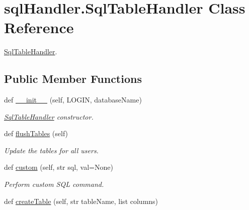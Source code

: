 \hypertarget{classsql_handler_1_1_sql_table_handler}{}\section{sql\+Handler.\+Sql\+Table\+Handler Class Reference}
\label{classsql_handler_1_1_sql_table_handler}


\mbox{\hyperlink{classsql_handler_1_1_sql_table_handler}{Sql\+Table\+Handler}}.  


\subsection*{Public Member Functions}
\begin{DoxyCompactItemize}
\item 
def \mbox{\hyperlink{classsql_handler_1_1_sql_table_handler_a3eba23f872710ef3a21c172a9469a449}{\+\_\+\+\_\+init\+\_\+\+\_\+}} (self, L\+O\+G\+IN, database\+Name)
\begin{DoxyCompactList}\small\item\em \mbox{\hyperlink{classsql_handler_1_1_sql_table_handler}{Sql\+Table\+Handler}} constructor. \end{DoxyCompactList}\item 
\mbox{\label{classsql_handler_1_1_sql_table_handler_a70fc8504c5f3b3a5d7fe482f6907cb74}} 
def \mbox{\hyperlink{classsql_handler_1_1_sql_table_handler_a70fc8504c5f3b3a5d7fe482f6907cb74}{flush\+Tables}} (self)
\begin{DoxyCompactList}\small\item\em Update the tables for all users. \end{DoxyCompactList}\item 
def \mbox{\hyperlink{classsql_handler_1_1_sql_table_handler_a153cbc56e8b7a0b595566d4e28c1d482}{custom}} (self, str sql, val=None)
\begin{DoxyCompactList}\small\item\em Perform custom S\+QL command. \end{DoxyCompactList}\item 
\mbox{\label{classsql_handler_1_1_sql_table_handler_a9ccdd57a7de36b369c28d194550cdff1}} 
def \mbox{\hyperlink{classsql_handler_1_1_sql_table_handler_a9ccdd57a7de36b369c28d194550cdff1}{create\+Table}} (self, str table\+Name, list columns)

\end{DoxyCompactItemize}
